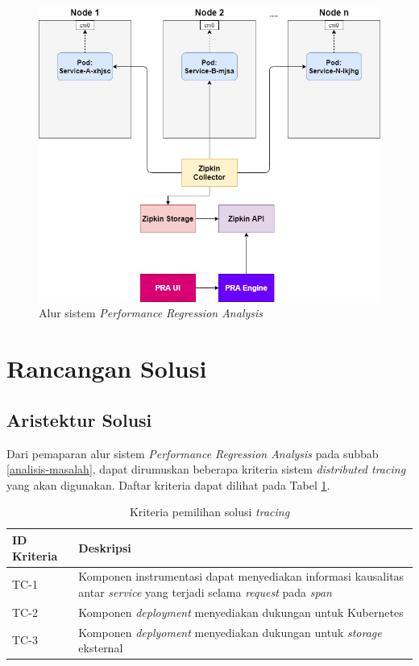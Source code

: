 \begin{figure}[!htb]
	\centering
	\includegraphics[width=1\textwidth]{resources/ch3/alur.png}
	\caption{Alur sistem \textit{Performance Regression Analysis}}
	\label{alur-pra}
\end{figure}

\section{Rancangan Solusi}

\subsection{Aristektur Solusi}

Dari pemaparan alur sistem \textit{Performance Regression Analysis} pada subbab \ref{analisis-masalah}, dapat dirumuskan beberapa kriteria sistem \textit{distributed tracing} yang akan digunakan. Daftar kriteria dapat dilihat pada Tabel \ref{ch3-trace-crit}.
\begin{small}
	\begin{longtable}{ | p{3cm} | p{10cm} |}
		\caption{Kriteria pemilihan solusi \textit{tracing}}
		\label{ch3-trace-crit}                                                           
		\\ \hline
		\centering\bfseries{ID Kriteria} & \centering\bfseries{Deskripsi} \tabularnewline \hline
		\endfirsthead
		TC-1 & Komponen instrumentasi dapat menyediakan informasi kausalitas antar \textit{service} yang terjadi selama \textit{request} pada \textit{span} \\ \hline
		TC-2 & Komponen \textit{deployment} menyediakan dukungan untuk Kubernetes \\ \hline
		TC-3 & Komponen \textit{deplyoment} menyediakan dukungan untuk \textit{storage} eksternal \\ \hline
	\end{longtable}
\end{small}

